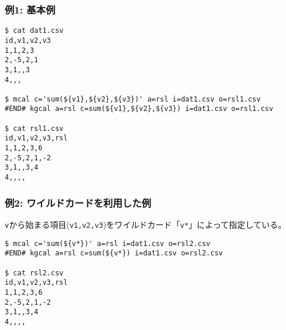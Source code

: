 
\subsubsection*{例1: 基本例}


\begin{Verbatim}[baselinestretch=0.7,frame=single]
$ cat dat1.csv
id,v1,v2,v3
1,1,2,3
2,-5,2,1
3,1,,3
4,,,

$ mcal c='sum(${v1},${v2},${v3})' a=rsl i=dat1.csv o=rsl1.csv
#END# kgcal a=rsl c=sum(${v1},${v2},${v3}) i=dat1.csv o=rsl1.csv

$ cat rsl1.csv
id,v1,v2,v3,rsl
1,1,2,3,6
2,-5,2,1,-2
3,1,,3,4
4,,,,
\end{Verbatim}

\subsubsection*{例2: ワイルドカードを利用した例}

\verb|v|から始まる項目(\verb|v1,v2,v3|)をワイルドカード「\verb|v*|」によって指定している。

\begin{Verbatim}[baselinestretch=0.7,frame=single]
$ mcal c='sum(${v*})' a=rsl i=dat1.csv o=rsl2.csv
#END# kgcal a=rsl c=sum(${v*}) i=dat1.csv o=rsl2.csv

$ cat rsl2.csv
id,v1,v2,v3,rsl
1,1,2,3,6
2,-5,2,1,-2
3,1,,3,4
4,,,,
\end{Verbatim}
